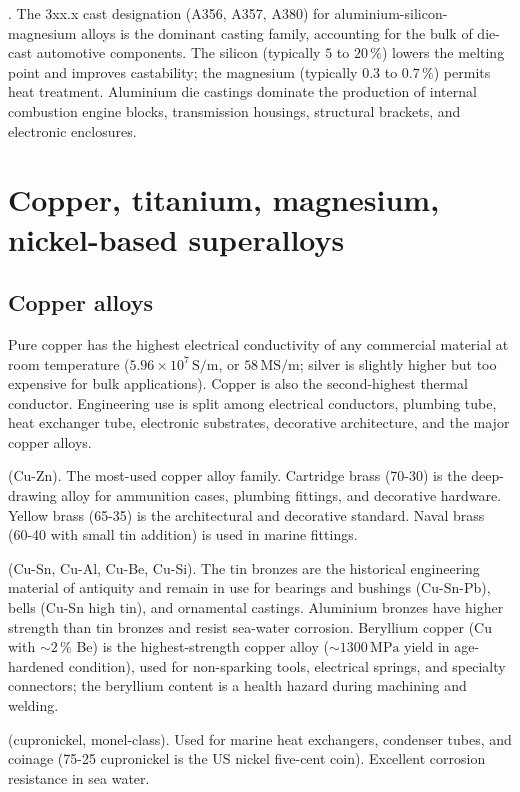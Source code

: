 . The 3xx.x cast designation (A356, A357,
A380) for aluminium-silicon-magnesium alloys is the dominant casting
family, accounting for the bulk of die-cast automotive components.
The silicon (typically $5$ to $20\,\%$) lowers the melting point and
improves castability; the magnesium (typically $0.3$ to $0.7\,\%$)
permits heat treatment. Aluminium die castings dominate the
production of internal combustion engine blocks, transmission
housings, structural brackets, and electronic enclosures.

\section{Copper, titanium, magnesium, nickel-based superalloys}

\subsection{Copper alloys}

Pure copper has the highest electrical conductivity of any commercial
material at room temperature ($5.96 \times 10^7\,\text{S}/\text{m}$,
or $58\,\text{MS}/\text{m}$; silver is slightly higher but too
expensive for bulk applications). Copper is also the second-highest
thermal conductor. Engineering use is split among electrical
conductors, plumbing tube, heat exchanger tube, electronic
substrates, decorative architecture, and the major copper alloys.

 (Cu-Zn). The most-used copper alloy family.
Cartridge brass (70-30) is the deep-drawing alloy for ammunition
cases, plumbing fittings, and decorative hardware. Yellow brass
(65-35) is the architectural and decorative standard. Naval brass
(60-40 with small tin addition) is used in marine fittings.

 (Cu-Sn, Cu-Al, Cu-Be, Cu-Si). The tin bronzes are
the historical engineering material of antiquity and remain in use
for bearings and bushings (Cu-Sn-Pb), bells (Cu-Sn high tin), and
ornamental castings. Aluminium bronzes have higher strength than
tin bronzes and resist sea-water corrosion. Beryllium copper (Cu with
$\sim 2\,\%$ Be) is the highest-strength copper alloy ($\sim 1300\,
\text{MPa}$ yield in age-hardened condition), used for non-sparking
tools, electrical springs, and specialty connectors; the beryllium
content is a health hazard during machining and welding.

 (cupronickel, monel-class). Used for marine
heat exchangers, condenser tubes, and coinage (75-25 cupronickel is
the US nickel five-cent coin). Excellent corrosion resistance in
sea water.


